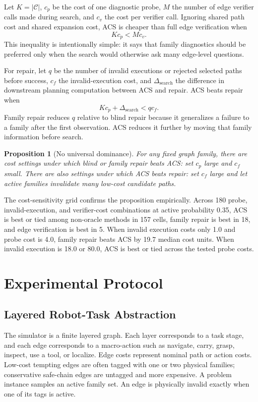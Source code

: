 \documentclass{article}
\newtheorem{proposition}{Proposition}
\newcommand{\ACS}{\textsc{ACS}}
\newcommand{\Cset}{\mathcal{C}}
\begin{document}
Let $K=|\Cset|$, $c_p$ be the cost of one diagnostic probe, $M$ the number of edge verifier calls made during search, and $c_v$ the cost per verifier call. Ignoring shared path cost and shared expansion cost, \ACS{} is cheaper than full edge verification when
\[
    K c_p < M c_v.
\]
This inequality is intentionally simple: it says that family diagnostics should be preferred only when the search would otherwise ask many edge-level questions.

For repair, let $q$ be the number of invalid executions or rejected selected paths before success, $c_f$ the invalid-execution cost, and $\Delta_{\mathrm{search}}$ the difference in downstream planning computation between \ACS{} and repair. \ACS{} beats repair when
\[
    Kc_p + \Delta_{\mathrm{search}} < q c_f.
\]
Family repair reduces $q$ relative to blind repair because it generalizes a failure to a family after the first observation. \ACS{} reduces it further by moving that family information before search.

\begin{proposition}[No universal dominance]
For any fixed graph family, there are cost settings under which blind or family repair beats \ACS{}: set $c_p$ large and $c_f$ small. There are also settings under which \ACS{} beats repair: set $c_f$ large and let active families invalidate many low-cost candidate paths.
\end{proposition}

The cost-sensitivity grid confirms the proposition empirically. Across 180 probe, invalid-execution, and verifier-cost combinations at active probability 0.35, \ACS{} is best or tied among non-oracle methods in 157 cells, family repair is best in 18, and edge verification is best in 5. When invalid execution costs only 1.0 and probe cost is 4.0, family repair beats \ACS{} by 19.7 median cost units. When invalid execution is 18.0 or 80.0, \ACS{} is best or tied across the tested probe costs.

\section{Experimental Protocol}

\subsection{Layered Robot-Task Abstraction}

The simulator is a finite layered graph. Each layer corresponds to a task stage, and each edge corresponds to a macro-action such as navigate, carry, grasp, inspect, use a tool, or localize. Edge costs represent nominal path or action costs. Low-cost tempting edges are often tagged with one or two physical families; conservative safe-chain edges are untagged and more expensive. A problem instance samples an active family set. An edge is physically invalid exactly when one of its tags is active.
\end{document}
